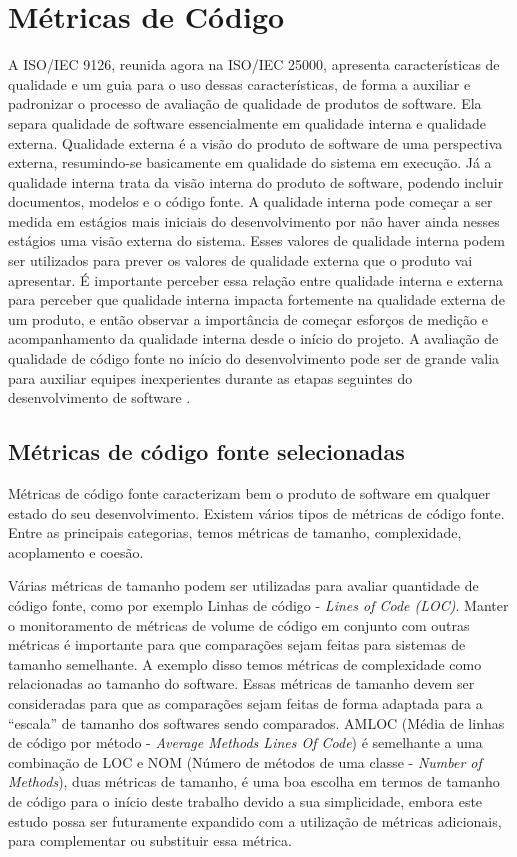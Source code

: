 \chapter{Métricas de Código}
\label{cap:metricas}

A ISO/IEC 9126, reunida agora na ISO/IEC 25000, apresenta características de qualidade e um guia para o uso dessas características, de forma a auxiliar e padronizar o processo de avaliação de qualidade de produtos de software. Ela separa qualidade de software essencialmente em qualidade interna e qualidade externa. Qualidade externa é a visão do produto de software de uma perspectiva externa, resumindo-se basicamente em qualidade do sistema em execução. Já a qualidade interna trata da visão interna do produto de software, podendo incluir documentos, modelos e o código fonte. A qualidade interna pode começar a ser medida em estágios mais iniciais do desenvolvimento por não haver ainda nesses estágios uma visão externa do sistema. Esses valores de qualidade interna podem ser utilizados para prever os valores de qualidade externa que o produto vai apresentar. É importante perceber essa relação entre qualidade interna e externa para perceber que qualidade interna impacta fortemente na qualidade externa de um produto, e então observar a importância de começar esforços de medição e acompanhamento da qualidade interna desde o início do projeto. A avaliação de qualidade de código fonte no início do desenvolvimento pode ser de grande valia para auxiliar equipes inexperientes durante as etapas seguintes do desenvolvimento de software \cite{meirelles2013}.

\section{Métricas de código fonte selecionadas}

Métricas de código fonte caracterizam bem o produto de software em qualquer estado do seu desenvolvimento. Existem vários tipos de métricas de código fonte. Entre as principais categorias, temos métricas de tamanho, complexidade, acoplamento e coesão.

Várias métricas de tamanho podem ser utilizadas para avaliar quantidade de código fonte, como por exemplo Linhas de código - \textit{Lines of Code (LOC)}. Manter o monitoramento de métricas de volume de código em conjunto com outras métricas é importante para que comparações sejam feitas para sistemas de tamanho semelhante. A exemplo disso temos métricas de complexidade como relacionadas ao tamanho do software. Essas métricas de tamanho devem ser consideradas para que as comparações sejam feitas de forma adaptada para a ``escala'' de tamanho dos softwares sendo comparados. AMLOC (Média de linhas de código por método - \textit{Average Methods Lines Of Code}) é semelhante a uma combinação de LOC e NOM (Número de métodos de uma classe - \textit{Number of Methods}), duas métricas de tamanho, é uma boa escolha em termos de tamanho de código para o início deste trabalho devido a sua simplicidade, embora este estudo possa ser futuramente expandido com a utilização de métricas adicionais, para complementar ou substituir essa métrica. 

